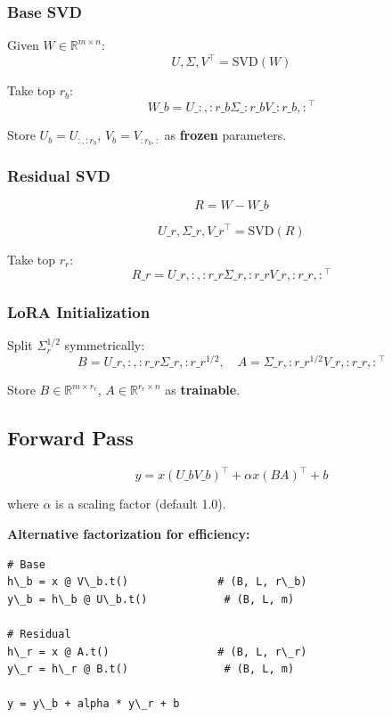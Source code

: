 \subsubsection{Base SVD}

Given $W \in \mathbb{R}^{m \times n}$:
\[
U, \Sigma, V^\top = \text{SVD}(W)
\tag{4.1}
\]

Take top $r_b$:
\[
W\_b = U\_{:, :r\_b} \Sigma\_{:r\_b} V\_{:r\_b, :}^\top
\tag{4.2}
\]

Store $U_b = U_{:, :r_b}$, $V_b = V_{:r_b, :}$ as \textbf{frozen} parameters.

\subsubsection{Residual SVD}

\[
R = W - W\_b
\tag{4.3}
\]

\[
U\_r, \Sigma\_r, V\_r^\top = \text{SVD}(R)
\tag{4.4}
\]

Take top $r_r$:
\[
R\_r = U\_{r, :, :r\_r} \Sigma\_{r, :r\_r} V\_{r, :r\_r, :}^\top
\tag{4.5}
\]

\subsubsection{LoRA Initialization}

Split $\Sigma_r^{1/2}$ symmetrically:
\[
B = U\_{r, :, :r\_r} \Sigma\_{r, :r\_r}^{1/2}, \quad
A = \Sigma\_{r, :r\_r}^{1/2} V\_{r, :r\_r, :}^\top
\tag{4.6}
\]

Store $B \in \mathbb{R}^{m \times r_r}$, $A \in \mathbb{R}^{r_r \times n}$ as 
\textbf{trainable}.

\subsection{Forward Pass}

\[
y = x (U\_b V\_b)^\top + \alpha x (B A)^\top + b
\tag{4.7}
\]

where $\alpha$ is a scaling factor (default 1.0).

\textbf{Alternative factorization for efficiency:}
\begin{lstlisting}
# Base
h\_b = x @ V\_b.t()              # (B, L, r\_b)
y\_b = h\_b @ U\_b.t()            # (B, L, m)

# Residual
h\_r = x @ A.t()                 # (B, L, r\_r)
y\_r = h\_r @ B.t()               # (B, L, m)

y = y\_b + alpha * y\_r + b
\end{lstlisting}

